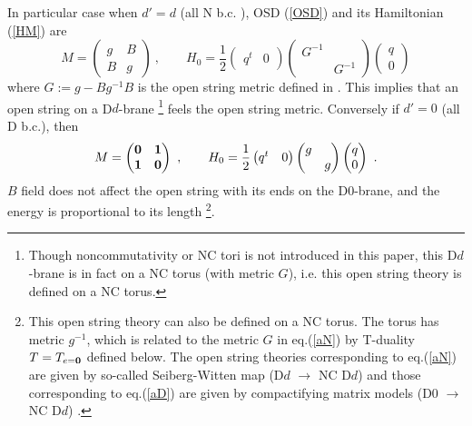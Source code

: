 \documentclass[a4paper,12pt]{article}
\newcommand{\bp}{\begin{pmatrix}}
\newcommand{\ep}{\end{pmatrix}}
\def \raw{\rightarrow}
\def \ov#1{\frac{1}{#1}}
\def \0{{\bf 0}}
\begin{document}
In particular case when $d'=d$ (all N b.c. ), 
OSD (\ref{OSD}) and its Hamiltonian (\ref{HM}) are 
\begin{equation}
 M=
 \bp
  g&B\\
  B&g
 \ep
\ ,\qquad 
 H_0=\ov{2}\bp q^t & 0 \ep \bp G^{-1} &  \\  & G^{-1} \ep \bp q\\ 0 \ep
 \label{aN}
\end{equation}
where $G:=g-Bg^{-1}B$ is the open string metric defined in \cite{SW}. 
This implies that an open string on a D$d$-brane
\footnote{Though noncommutativity or NC tori is not introduced 
in this paper, this D$d$-brane is in fact on a NC torus 
(with metric $G$), i.e. this open string theory is defined 
on a NC torus.} 
feels the open string metric. 
Conversely if $d'=0$ (all D b.c.), then 
\begin{equation}
 M=\bp {\bf 0}&{\bf 1}\\ {\bf 1}&{\bf 0} \ep\ ,\qquad 
 H_0=\ov{2}\bp q^t & 0\ep\bp g& \\ &g\ep\bp q\\ 0\ep\ .\label{aD}
\end{equation}
$B$ field does not affect the open string with its ends on the D$0$-brane, 
and the energy is proportional to its length
\footnote{This open string theory can also be defined 
on a NC torus. 
The torus has metric $g^{-1}$, which is related to the metric $G$ 
in eq.(\ref{aN}) by T-duality $T=T_{e=\0}$ 
defined below. The open string theories corresponding to eq.(\ref{aN}) are 
given by so-called Seiberg-Witten map (D$d$ $\raw$ NC D$d$) \cite{SW} and 
those corresponding to eq.(\ref{aD}) are given by compactifying 
matrix models (D$0$ $\raw$ NC D$d$) \cite{CDS,Ho,MZ,BMZ,PS,KO,CK,KS}. }. 
\end{document}
